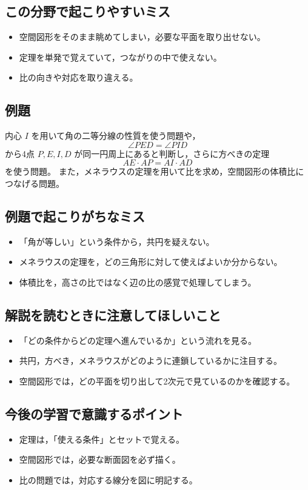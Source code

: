 \subsection*{この分野で起こりやすいミス}
\begin{itemize}
  \item 空間図形をそのまま眺めてしまい，必要な平面を取り出せない。
  \item 定理を単発で覚えていて，つながりの中で使えない。
  \item 比の向きや対応を取り違える。
\end{itemize}

\subsection*{例題}
内心 $I$ を用いて角の二等分線の性質を使う問題や，
\[
\angle PED=\angle PID
\]
から4点 $P,E,I,D$ が同一円周上にあると判断し，さらに方べきの定理
\[
AE\cdot AP=AI\cdot AD
\]
を使う問題。  
また，メネラウスの定理を用いて比を求め，空間図形の体積比につなげる問題。

\subsection*{例題で起こりがちなミス}
\begin{itemize}
  \item 「角が等しい」という条件から，共円を疑えない。
  \item メネラウスの定理を，どの三角形に対して使えばよいか分からない。
  \item 体積比を，高さの比ではなく辺の比の感覚で処理してしまう。
\end{itemize}

\subsection*{解説を読むときに注意してほしいこと}
\begin{itemize}
  \item 「どの条件からどの定理へ進んでいるか」という流れを見る。
  \item 共円，方べき，メネラウスがどのように連鎖しているかに注目する。
  \item 空間図形では，どの平面を切り出して2次元で見ているのかを確認する。
\end{itemize}

\subsection*{今後の学習で意識するポイント}
\begin{itemize}
  \item 定理は，「使える条件」とセットで覚える。
  \item 空間図形では，必要な断面図を必ず描く。
  \item 比の問題では，対応する線分を図に明記する。
\end{itemize}

